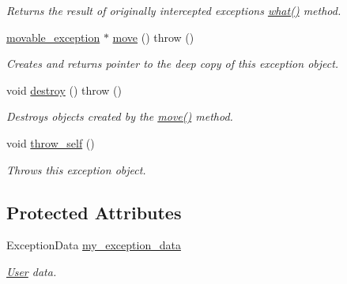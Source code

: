 \begin{DoxyCompactItemize}
\begin{DoxyCompactList}\small\item\em Returns the result of originally intercepted exception\textquotesingle{}s \hyperlink{classtbb_1_1movable__exception_a41a2a7b61537ecd684bae760366f611c}{what()} method. \end{DoxyCompactList}\item 
\hyperlink{classtbb_1_1movable__exception}{movable\+\_\+exception} $\ast$ \hyperlink{classtbb_1_1movable__exception_aeb47d3ac90a1f01fe642b572f6ac519d}{move} ()  throw ()
\begin{DoxyCompactList}\small\item\em Creates and returns pointer to the deep copy of this exception object. \end{DoxyCompactList}\item 
void \hyperlink{classtbb_1_1movable__exception_a02f0401b465690de797face2432d9421}{destroy} ()  throw ()
\begin{DoxyCompactList}\small\item\em Destroys objects created by the \hyperlink{classtbb_1_1movable__exception_aeb47d3ac90a1f01fe642b572f6ac519d}{move()} method. \end{DoxyCompactList}\item 
void \hyperlink{classtbb_1_1movable__exception_a3d1570b53220fbcb45eb81552b57827a}{throw\+\_\+self} ()
\begin{DoxyCompactList}\small\item\em Throws this exception object. \end{DoxyCompactList}\end{DoxyCompactItemize}
\subsection*{Protected Attributes}
\begin{DoxyCompactItemize}
\item 
\hypertarget{classtbb_1_1movable__exception_adba063da80054afe64d5268711084d9b}{}Exception\+Data \hyperlink{classtbb_1_1movable__exception_adba063da80054afe64d5268711084d9b}{my\+\_\+exception\+\_\+data}\label{classtbb_1_1movable__exception_adba063da80054afe64d5268711084d9b}

\begin{DoxyCompactList}\small\item\em \hyperlink{classUser}{User} data. \end{DoxyCompactList}\end{DoxyCompactItemize}


